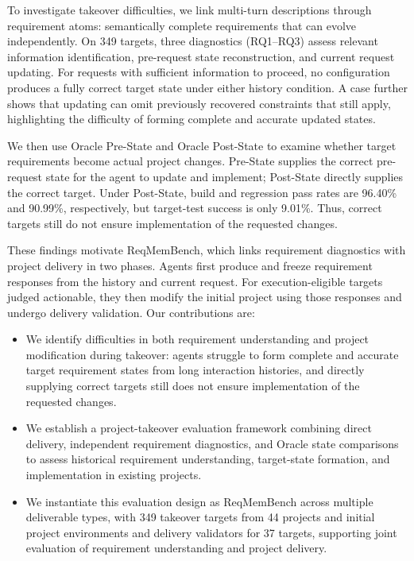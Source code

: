 \documentclass{article} %
\begin{document}
To investigate takeover difficulties, we link multi-turn descriptions through requirement atoms: semantically complete requirements that can evolve independently. On 349 targets, three diagnostics (RQ1--RQ3) assess relevant information identification, pre-request state reconstruction, and current request updating. For requests with sufficient information to proceed, no configuration produces a fully correct target state under either history condition. A case further shows that updating can omit previously recovered constraints that still apply, highlighting the difficulty of forming complete and accurate updated states.

We then use Oracle Pre-State and Oracle Post-State to examine whether target requirements become actual project changes. Pre-State supplies the correct pre-request state for the agent to update and implement; Post-State directly supplies the correct target. Under Post-State, build and regression pass rates are 96.40\% and 90.99\%, respectively, but target-test success is only 9.01\%. Thus, correct targets still do not ensure implementation of the requested changes.

These findings motivate ReqMemBench, which links requirement diagnostics with project delivery in two phases. Agents first produce and freeze requirement responses from the history and current request. For execution-eligible targets judged actionable, they then modify the initial project using those responses and undergo delivery validation. Our contributions are:

\begin{itemize}
\item We identify difficulties in both requirement understanding and project modification during takeover: agents struggle to form complete and accurate target requirement states from long interaction histories, and directly supplying correct targets still does not ensure implementation of the requested changes.
\item We establish a project-takeover evaluation framework combining direct delivery, independent requirement diagnostics, and Oracle state comparisons to assess historical requirement understanding, target-state formation, and implementation in existing projects.
\item We instantiate this evaluation design as ReqMemBench across multiple deliverable types, with 349 takeover targets from 44 projects and initial project environments and delivery validators for 37 targets, supporting joint evaluation of requirement understanding and project delivery.
\end{itemize}
\end{document}

